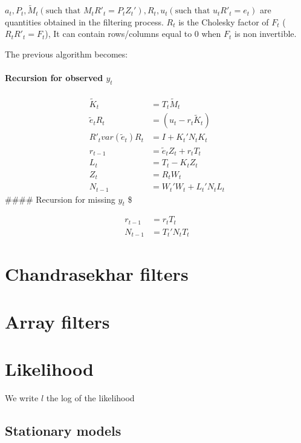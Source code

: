 \documentclass[
  letterpaper,
  DIV=11,
  numbers=noendperiod]{scrreprt}
\begin{document}
\(a_t, P_t, \tilde M_t \left(\text{such that }M_t R'_t = P_t Z_t' \right), R_t, u_t\left(\text{such that } u_t R'_t = e_t \right)\)
are quantities obtained in the filtering process. \(R_t\) is the
Cholesky factor of \(F_t\) (\(R_t R'_t = F_t\)), It can contain
rows/columns equal to 0 when \(F_t\) is non invertible.

The previous algorithm becomes:

\subsubsection{\texorpdfstring{Recursion for observed
\(y_t\)}{Recursion for observed y\_t}}\label{recursion-for-observed-y_t}

\[
\begin{align*}
\tilde K_t &= T_t \tilde M_t \\
\tilde e_t R_t &= (u_t - r_t \tilde K_t) \\
R'_t var(\tilde e_t) R_t &= I+ K_t' N_t K_t \\
r_{t-1} &= \tilde e_t Z_t + r_t T_t \\
L_t &= T_t - K_t Z_t \\
Z_t &= R_t W_t \\
N_{t-1} &= W_t' W_t + L_t' N_t L_t
\end{align*}
\] \#\#\#\# Recursion for missing \(y_t\) \$

\[
\begin{align*}
 r_{t-1} &= r_t T_t \\
N_{t-1} &= T_t' N_t T_t
\end{align*}
\]

\chapter{Chandrasekhar filters}\label{chandrasekhar-filters}

\chapter{Array filters}\label{array-filters}

\chapter{Likelihood}\label{likelihood}

We write \(l\) the log of the likelihood

\section{Stationary models}\label{stationary-models}
\end{document}

